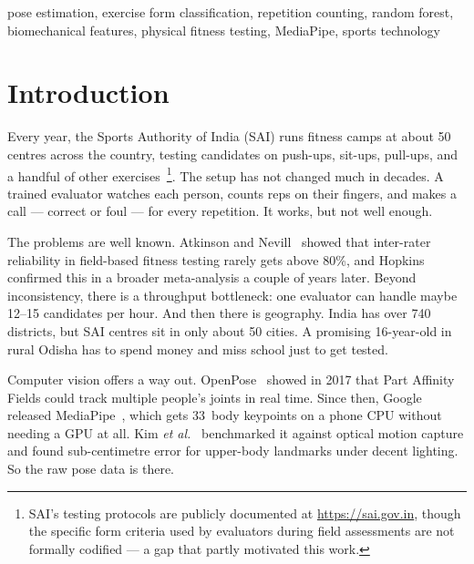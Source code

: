 \documentclass[conference]{IEEEtran}
\begin{document}
\begin{IEEEkeywords}
pose estimation, exercise form classification, repetition counting, random forest, biomechanical features, physical fitness testing, MediaPipe, sports technology
\end{IEEEkeywords}

\section{Introduction}

Every year, the Sports Authority of India (SAI) runs fitness camps at about 50 centres across the country, testing candidates on push-ups, sit-ups, pull-ups, and a handful of other exercises~\cite{sai2023}\footnote{SAI's testing protocols are publicly documented at \url{https://sai.gov.in}, though the specific form criteria used by evaluators during field assessments are not formally codified --- a gap that partly motivated this work.}. The setup has not changed much in decades. A trained evaluator watches each person, counts reps on their fingers, and makes a call --- correct or foul --- for every repetition. It works, but not well enough.

The problems are well known. Atkinson and Nevill~\cite{atkinson1998} showed that inter-rater reliability in field-based fitness testing rarely gets above 80\%, and Hopkins~\cite{hopkins2000} confirmed this in a broader meta-analysis a couple of years later. Beyond inconsistency, there is a throughput bottleneck: one evaluator can handle maybe 12--15 candidates per hour. And then there is geography. India has over 740 districts, but SAI centres sit in only about 50 cities. A promising 16-year-old in rural Odisha has to spend money and miss school just to get tested.

Computer vision offers a way out. OpenPose~\cite{cao2017} showed in 2017 that Part Affinity Fields could track multiple people's joints in real time. Since then, Google released MediaPipe~\cite{bazarevsky2020,lugaresi2019}, which gets 33~body keypoints on a phone CPU without needing a GPU at all. Kim \textit{et al.}~\cite{kim2023} benchmarked it against optical motion capture and found sub-centimetre error for upper-body landmarks under decent lighting. So the raw pose data is there.
\end{document}
